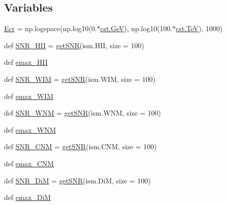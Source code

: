 \subsection*{Variables}
\begin{DoxyCompactItemize}
\item 
\hyperlink{namespaceEscapeModel__protons__2_a62e66b8006971b0139c21f5fcb089c1d}{Ecr} = np.\+logspace(np.\+log10(0.$\ast$\hyperlink{constants_8h_aec0e126d9991db8ad0b26139f5860568}{cst.\+GeV}), np.\+log10(100.$\ast$\hyperlink{constants_8h_a7f801e1f6821bc6baf0652ed2496e5e9}{cst.\+TeV}), 1000)
\item 
def \hyperlink{namespaceEscapeModel__protons__2_ab57fd49372db6ffbf51473fbbc188b38}{S\+N\+R\+\_\+\+H\+II} = \hyperlink{namespaceEscapeModel__protons__2_acf65596d83b73535f7b6f4934e134f4f}{get\+S\+NR}(ism.\+H\+II, size = 100)
\item 
def \hyperlink{namespaceEscapeModel__protons__2_a9b7a339d62cd28fa48569b3e78d15dbd}{emax\+\_\+\+H\+II}
\item 
def \hyperlink{namespaceEscapeModel__protons__2_a8a16fa527b6dcc29d16680673361aea8}{S\+N\+R\+\_\+\+W\+IM} = \hyperlink{namespaceEscapeModel__protons__2_acf65596d83b73535f7b6f4934e134f4f}{get\+S\+NR}(ism.\+W\+IM, size = 100)
\item 
def \hyperlink{namespaceEscapeModel__protons__2_af86cc929ced5a0922cde669769a9f1e5}{emax\+\_\+\+W\+IM}
\item 
def \hyperlink{namespaceEscapeModel__protons__2_a24207c635e7f417c42a38acce5e7f2b2}{S\+N\+R\+\_\+\+W\+NM} = \hyperlink{namespaceEscapeModel__protons__2_acf65596d83b73535f7b6f4934e134f4f}{get\+S\+NR}(ism.\+W\+NM, size = 100)
\item 
def \hyperlink{namespaceEscapeModel__protons__2_aecfee6e8c0bd69fcea50b0d823e3b065}{emax\+\_\+\+W\+NM}
\item 
def \hyperlink{namespaceEscapeModel__protons__2_aca8b122fd7aeca73e884d5dc1a62e687}{S\+N\+R\+\_\+\+C\+NM} = \hyperlink{namespaceEscapeModel__protons__2_acf65596d83b73535f7b6f4934e134f4f}{get\+S\+NR}(ism.\+C\+NM, size = 100)
\item 
def \hyperlink{namespaceEscapeModel__protons__2_a2f47d632f5749ece7fab07e8c5f45114}{emax\+\_\+\+C\+NM}
\item 
def \hyperlink{namespaceEscapeModel__protons__2_a9037d7a5d1d7187638b740499fdc3d77}{S\+N\+R\+\_\+\+DiM} = \hyperlink{namespaceEscapeModel__protons__2_acf65596d83b73535f7b6f4934e134f4f}{get\+S\+NR}(ism.\+DiM, size = 100)
\item 
def \hyperlink{namespaceEscapeModel__protons__2_a22e070917067210d2d15b8c6d19f3d94}{emax\+\_\+\+DiM}

\end{DoxyCompactItemize}
